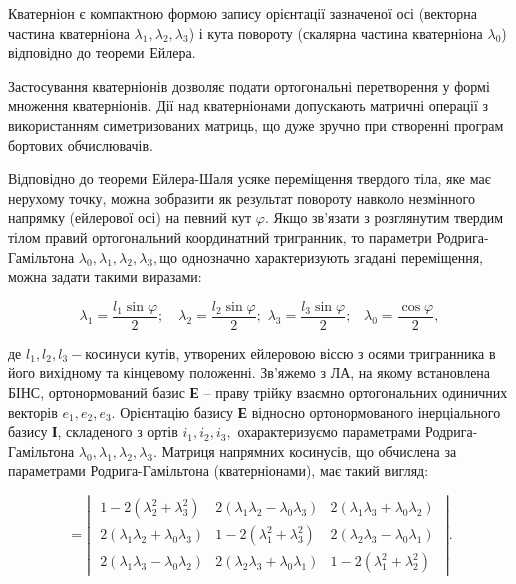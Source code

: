 Кватерніон є компактною формою запису орієнтації зазначеної осі (векторна частина 
кватерніона $\lambda_{1} ,\lambda_{2} ,\lambda_{3} $) і кута повороту (скалярна 
частина кватерніона $\lambda_{0} $) відповідно до теореми Ейлера.

Застосування кватерніонів дозволяє подати ортогональні перетворення у формі множення 
кватерніонів. Дії над кватерніонами допускають матричні операції з використанням 
симетризованих матриць, що дуже зручно при створенні програм бортових обчислювачів. 

Відповідно 
до теореми Ейлера-Шаля усяке переміщення твердого тіла, яке має нерухому точку, можна 
зобразити як результат повороту навколо незмінного напрямку (ейлерової осі) на певний 
кут $\varphi $. Якщо зв'язати з розглянутим твердим тілом правий ортогональний координатний 
тригранник, то параметри Родрига-Гамільтона $\lambda_{0} ,\lambda_{1} ,\lambda 
_{2} ,\lambda_{3} ,$що однозначно характеризують згадані переміщення, можна задати 
такими виразами: 

\[\lambda_{1} =\frac{l_{1} \sin \varphi }{2} ;\, \, \, \, \, \, \lambda_{2} =\frac{l_{2} 
\sin \varphi }{2} ;\, \, \lambda_{3} =\frac{l_{3} \sin \varphi }{2} ;\, \, \, \, 
\, \lambda_{0} =\frac{\cos \varphi }{2} ,\] 

де $l_{1} ,l_{2} ,l_{3} -$косинуси кутів, утворених ейлеровою віссю з осями тригранника 
в його вихідному та кінцевому положенні. Зв'яжемо з ЛА, на якому встановлена БІНС, 
ортонормований базис \textbf{Е} -- праву трійку взаємно ортогональних одиничних 
векторів $e_{1} ,e_{2} ,e_{3} .$ Орієнтацію базису \textbf{Е} відносно ортонормованого 
інерціального базису \textbf{І}, складеного з ортів $i_{1} ,i_{2} ,i_{3} ,$ охарактеризуємо 
параметрами Родрига-Гамільтона $\lambda_{0} ,\lambda_{1} ,\lambda_{2} ,\lambda 
_{3} .$ Матриця напрямних  косинусів, що обчислена за параметрами Родрига-Гамільтона 
(кватерніонами), має такий вигляд:

\[=\left|\, \, \begin{array}{ccc} {1-2(\lambda_{2}^{2} +\lambda_{3}^{2} )} & {2(
\lambda_{1} \lambda_{2} -\lambda_{0} \lambda_{3} )} & {2(\lambda_{1} \lambda 
_{3} +\lambda_{0} \lambda_{2} )} \\ {2(\lambda_{1} \lambda_{2} +\lambda_{0} 
\lambda_{3} )} & {1-2(\lambda_{1}^{2} +\lambda_{3}^{2} )} & {2(\lambda_{2} \lambda 
_{3} -\lambda_{0} \lambda_{1} )} \\ {2(\lambda_{1} \lambda_{3} -\lambda_{0} 
\lambda_{2} )} & {2(\lambda_{2} \lambda_{3} +\lambda_{0} \lambda_{1} )} & {1-2(
\lambda_{1}^{2} +\lambda_{2}^{2} )} \end{array}\, \, \right| .\] 

